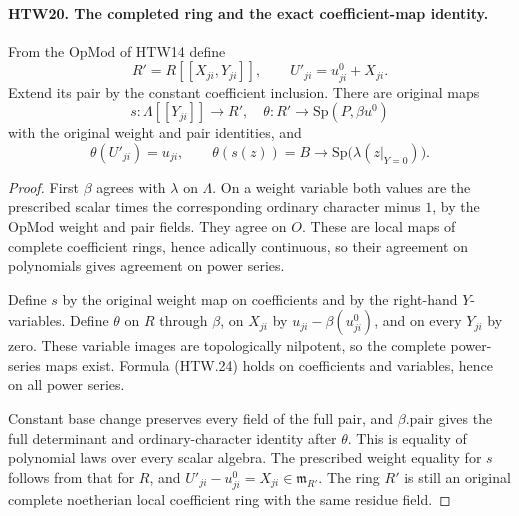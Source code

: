 \documentclass[11pt,a4paper]{article}
\numberwithin{equation}{section}
\theoremstyle{remark}\newtheorem{remark}[theorem]{Remark}
\begin{document}
\paragraph{HTW20. The completed ring and the exact coefficient-map identity.}
\label{claim:HTW20}
From the \(\mathrm{OpMod}\) of HTW14 define
\[
 R'=R[[X_{ji},Y_{ji}]],\qquad U'_{ji}=u^0_{ji}+X_{ji}.
 \tag{HTW.23}
\]
Extend its pair by the constant coefficient inclusion.
There are original maps
\[
 s:\Lambda[[Y_{ji}]]\longrightarrow R',
 \quad
 \theta:R'\longrightarrow\mathrm{Sp}(P,\beta u^0)
\]
with the original weight and pair identities, and
\[
 \theta(U'_{ji})=u_{ji},\qquad
 \theta(s(z))=
       B\longrightarrow\mathrm{Sp}\bigl(\lambda(z|_{Y=0})\bigr).
 \tag{HTW.24}
\]
\begin{proof}
First \(\beta\) agrees with \(\lambda\) on
\(\Lambda\).  On a weight variable both values are
the prescribed scalar times the corresponding
ordinary character minus \(1\), by the
\(\mathrm{OpMod}\) weight and pair fields.
They agree on \(O\).  These are local maps of
complete coefficient rings, hence adically
continuous, so their agreement on polynomials
gives agreement on power series.

Define \(s\) by the original weight map on
coefficients and by the right-hand \(Y\)-variables.
Define \(\theta\) on \(R\) through \(\beta\),
on \(X_{ji}\) by \(u_{ji}-\beta(u^0_{ji})\),
and on every \(Y_{ji}\) by zero.  These variable
images are topologically nilpotent, so the
complete power-series maps exist.  Formula
(HTW.24) holds on coefficients and variables,
hence on all power series.

Constant base change preserves every field of
the full pair, and \(\beta.\mathrm{pair}\) gives
the full determinant and ordinary-character
identity after \(\theta\).  This is equality of
polynomial laws over every scalar algebra.
The prescribed weight equality for \(s\) follows
from that for \(R\), and
\(U'_{ji}-u^0_{ji}=X_{ji}\in\mathfrak m_{R'}\).
The ring \(R'\) is still an original complete
noetherian local coefficient ring with the same
residue field.
\end{proof}

\end{document}

